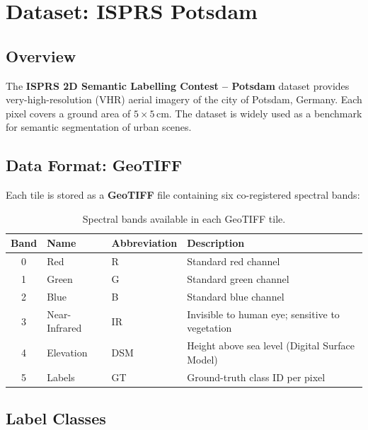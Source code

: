 \documentclass[12pt,a4paper]{article}
\begin{document}
\section{Dataset: ISPRS Potsdam}

\subsection{Overview}

The \textbf{ISPRS 2D Semantic Labelling Contest -- Potsdam} dataset provides
very-high-resolution (VHR) aerial imagery of the city of Potsdam, Germany.
Each pixel covers a ground area of $5 \times 5$\,cm.
The dataset is widely used as a benchmark for semantic segmentation of urban scenes.

\subsection{Data Format: GeoTIFF}

Each tile is stored as a \textbf{GeoTIFF} file containing six co-registered spectral bands:

\begin{table}[h!]
  \centering
  \caption{Spectral bands available in each GeoTIFF tile.}
  \begin{tabular}{clll}
    \toprule
    \textbf{Band} & \textbf{Name} & \textbf{Abbreviation} & \textbf{Description} \\
    \midrule
    0 & Red           & R    & Standard red channel \\
    1 & Green         & G    & Standard green channel \\
    2 & Blue          & B    & Standard blue channel \\
    3 & Near-Infrared & IR   & Invisible to human eye; sensitive to vegetation \\
    4 & Elevation     & DSM  & Height above sea level (Digital Surface Model) \\
    5 & Labels        & GT   & Ground-truth class ID per pixel \\
    \bottomrule
  \end{tabular}
\end{table}

\subsection{Label Classes}
\end{document}
